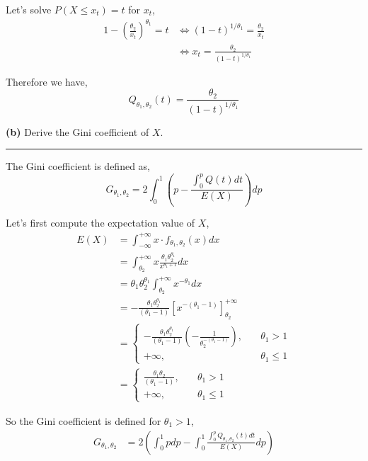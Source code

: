 \documentclass[10pt, a4paper, nofootinbib]{scrartcl}
\begin{document}
Let's solve $P(X \leq x_t) = t$ for $x_t$,
\begin{align*}
  1 - \left( \frac{\theta_2}{x_t} \right)^{\theta_1} = t 
    &\iff (1 - t)^{1/\theta_1}
      = \frac{\theta_2}{x_t}\\
    &\iff x_t 
      = \frac{\theta_2}{(1 - t)^{1/\theta_1}}
\end{align*}

Therefore we have, 
\begin{equation}
  Q_{\theta_1, \theta_2}(t) = \frac{\theta_2}{(1 - t)^{1/\theta_1}}
\end{equation}

\textbf{(b)} Derive the Gini coefficient of $X$.

\begin{center}\rule{6cm}{0.4pt}\end{center}

The Gini coefficient is defined as, 
\begin{equation}
  G_{\theta_1, \theta_2} = 2 \int_{0}^{1} \left( p - \frac{\int_{0}^{p} Q(t) dt}{E(X)} \right) dp
\end{equation}

Let's first compute the expectation value of $X$,
\begin{align*}
  E(X)
    &= \int_{-\infty}^{+\infty} x \cdot f_{\theta_1, \theta_2}(x) dx \\
    &= \int_{\theta_2}^{+\infty} x \frac{\theta_1 \theta_2^{\theta_1}}{x^{\theta_1 + 1}} dx \\
    &= \theta_1 \theta_2^{\theta_1} \int_{\theta_2}^{+\infty} x^{- \theta_1} dx \\
    &= - \frac{\theta_1 \theta_2^{\theta_1}}{(\theta_1 - 1)} \left[ x^{-(\theta_1 - 1)} \right]_{\theta_2}^{+\infty} \\
    &= \begin{cases}
      - \frac{\theta_1 \theta_2^{\theta_1}}{(\theta_1 - 1)} \left( - \frac{1}{\theta_2^{-(\theta_1 - 1)}} \right), &\quad \theta_1 > 1 \\
      +\infty, &\quad \theta_1 \leq 1
    \end{cases} \\
    &= \begin{cases}
      \frac{\theta_1 \theta_2}{(\theta_1 - 1)}, &\quad \theta_1 > 1 \\
      +\infty, &\quad \theta_1 \leq 1
    \end{cases}
\end{align*}

So the Gini coefficient is defined for $\theta_1 > 1$, 
\begin{align*}
  G_{\theta_1, \theta_2}
    &= 2 \left( \int_{0}^{1} p dp - \int_{0}^{1} \frac{\int_{0}^{p} Q_{\theta_1, \theta_2}(t) dt}{E(X)} dp \right) 
\end{align*}
\end{document}
